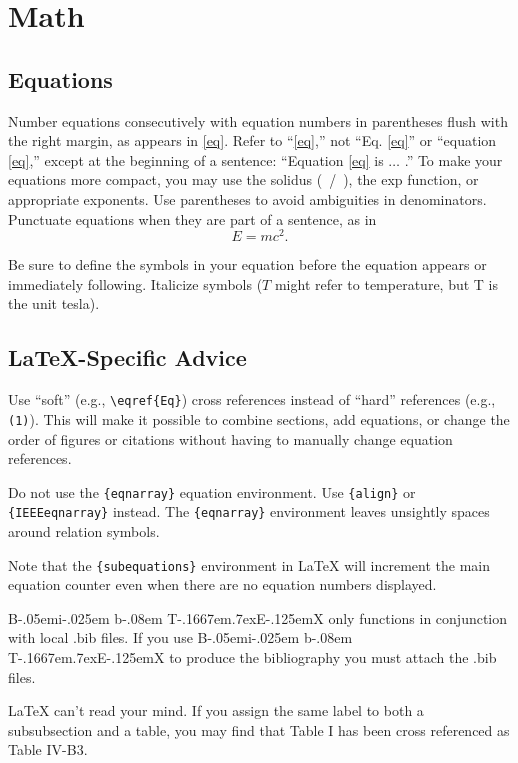 \documentclass[journal,twoside,web]{ieeecolor}
\def\BibTeX{{\rm B\kern-.05em{\sc i\kern-.025em b}\kern-.08em
    T\kern-.1667em\lower.7ex\hbox{E}\kern-.125emX}}
\begin{document}
\section{Math}
\subsection{Equations}
Number equations consecutively with equation numbers in parentheses flush
with the right margin, as appears in \eqref{eq}. Refer to ``\eqref{eq},'' not ``Eq. \eqref{eq}''
or ``equation \eqref{eq},'' except at the beginning of a sentence: ``Equation \eqref{eq}
is $\ldots$ .'' To make your equations more
compact, you may use the solidus (~/~), the exp function, or appropriate
exponents. Use parentheses to avoid ambiguities in denominators. Punctuate
equations when they are part of a sentence, as in
\begin{equation}E=mc^2.\label{eq}\end{equation}

Be sure to define the symbols in your equation before the equation appears or
immediately following. Italicize symbols ($T$ might refer
to temperature, but T is the unit tesla).

\subsection{\LaTeX-Specific Advice}

Use ``soft'' (e.g., \verb|\eqref{Eq}|) cross references instead
of ``hard'' references (e.g., \verb|(1)|). This will make it possible
to combine sections, add equations, or change the order of figures or
citations without having to manually change equation references.

Do not use the \verb|{eqnarray}| equation environment. Use
\verb|{align}| or \verb|{IEEEeqnarray}| instead. The \verb|{eqnarray}|
environment leaves unsightly spaces around relation symbols.

Note that the \verb|{subequations}| environment in {\LaTeX}
will increment the main equation counter even when there are no
equation numbers displayed.

    {\BibTeX} only functions in conjunction with local .bib files. If you use {\BibTeX} to produce the
bibliography you must attach the .bib files.

    {\LaTeX} can't read your mind. If you assign the same label to both a
subsubsection and a table, you may find that Table I has been cross
referenced as Table IV-B3.
\end{document}
